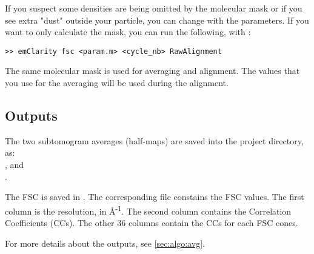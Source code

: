 If you suspect some densities are being omitted by the molecular mask or if you see extra "dust" outside your particle, you can change with the  parameters. If you want to only calculate the mask, you can run the following, with :
\begin{lstlisting}
>> emClarity fsc <param.m> <cycle_nb> RawAlignment
\end{lstlisting}
The same molecular mask is used for averaging and alignment. The values that you use for the averaging will be used during the alignment.

\newpage
\subsection{Outputs}

The two subtomogram averages (half-maps) are saved into the project directory, as:\\ , and\\ .

The FSC is saved in . The corresponding  file constains the FSC values. The first column is the resolution, in \r{A}\textsuperscript{-1}. The second column contains the Correlation Coefficients (CCs). The other 36 columns contain the CCs for each FSC cones.

For more details about the outputs, see \ref{sec:algo:avg}.